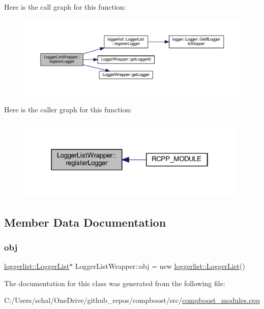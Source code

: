 Here is the call graph for this function\+:\nopagebreak
\begin{figure}[H]
\begin{center}
\leavevmode
\includegraphics[width=350pt]{class_logger_list_wrapper_a428932ced69ba53f256b832a94563524_cgraph}
\end{center}
\end{figure}
Here is the caller graph for this function\+:\nopagebreak
\begin{figure}[H]
\begin{center}
\leavevmode
\includegraphics[width=310pt]{class_logger_list_wrapper_a428932ced69ba53f256b832a94563524_icgraph}
\end{center}
\end{figure}


\subsection{Member Data Documentation}
\mbox{\label{class_logger_list_wrapper_a399fe67a339604a00e2b7654a4aba97c}} 
\subsubsection{\texorpdfstring{obj}{obj}}
{\footnotesize\ttfamily \mbox{\hyperlink{classloggerlist_1_1_logger_list}{loggerlist\+::\+Logger\+List}}$\ast$ Logger\+List\+Wrapper\+::obj = new \mbox{\hyperlink{classloggerlist_1_1_logger_list}{loggerlist\+::\+Logger\+List}}()\hspace{0.3cm}{\ttfamily [private]}}



The documentation for this class was generated from the following file\+:\begin{DoxyCompactItemize}
\item 
C\+:/\+Users/schal/\+One\+Drive/github\+\_\+repos/compboost/src/\mbox{\hyperlink{compboost__modules_8cpp}{compboost\+\_\+modules.\+cpp}}\end{DoxyCompactItemize}
